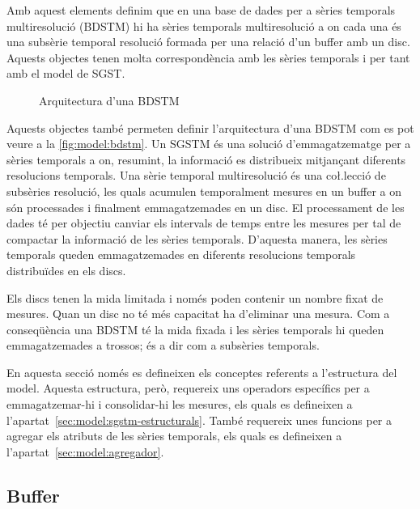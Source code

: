 Amb aquest elements definim que en una base de dades per a sèries
temporals multiresolució (BDSTM) hi ha sèries temporals multiresolució
a on cada una és una subsèrie temporal resolució formada per una
relació d'un buffer amb un disc. Aquests objectes tenen molta
correspondència amb les sèries temporals i per tant amb el model de
SGST.


\begin{figure}[tp]
\centering

\caption{Arquitectura d'una BDSTM}
\label{fig:model:bdstm}
\end{figure}


Aquests objectes també permeten definir l'arquitectura d'una BDSTM com
es pot veure a la \autoref{fig:model:bdstm}.  Un SGSTM és una solució
d'emmagatzematge per a sèries temporals a on, resumint, la informació
es distribueix mitjançant diferents resolucions temporals.  Una sèrie
temporal multiresolució és una co\l.lecció de subsèries resolució, les
quals acumulen temporalment mesures en un buffer a on són processades
i finalment emmagatzemades en un disc. El processament de les dades té
per objectiu canviar els intervals de temps entre les mesures per tal
de compactar la informació de les sèries temporals. D'aquesta manera,
les sèries temporals queden emmagatzemades en diferents resolucions
temporals distribuïdes en els discs.

Els discs tenen la mida limitada i només poden contenir un nombre
fixat de mesures. Quan un disc no té més capacitat ha d'eliminar una
mesura. Com a conseqüència una BDSTM té la mida fixada i les sèries
temporals hi queden emmagatzemades a trossos; és a dir com a subsèries
temporals. 


En aquesta secció només es defineixen els conceptes referents a
l'estructura del model. Aquesta estructura, però, requereix uns
operadors específics per a emmagatzemar-hi i consolidar-hi les
mesures, els quals es defineixen a
l'apartat~\ref{sec:model:sgstm-estructurals}. També requereix unes
funcions per a agregar els atributs de les sèries temporals, els quals
es defineixen a l'apartat~\ref{sec:model:agregador}.




\subsection{Buffer}\label{sec:model:buffer}

